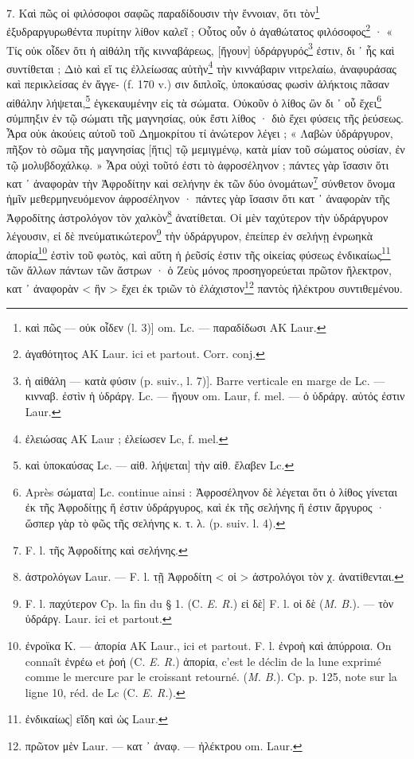 \documentclass[a4paper, 11pt, oneside, polutonikogreek, french]{article}
\begin{document}
7. Καὶ πῶς οἱ φιλόσοφοι σαφῶς παραδίδουσιν τὴν ἔννοιαν, ὅτι τὸν\footnote{καὶ πῶς --- οὐκ οἶδεν (l. 3)] om. Lc. --- παραδίδωσι AK Laur.} ἐξυδραργυρωθέντα πυρίτην λίθον καλεῖ ; Οὗτος οὖν ὁ ἀγαθώτατος φιλόσοφος\footnote{ἀγαθότητος AK Laur. ici et partout. Corr. conj.} · « Τίς οὐκ οἶδεν ὅτι ἡ αἰθάλη τῆς κινναβάρεως, [ἤγουν] ὑδράργυρός\footnote{ἡ αἰθάλη --- κατὰ φύσιν (p. suiv., l. 7)]. Barre verticale en marge de Lc. --- κινναβ. ἐστὶν ἡ ὐδράργ. Lc. --- ἤγουν om. Laur, f. mel. --- ὁ ὑδράργ. αὐτός ἐστιν Laur.} ἐστιν, δι ᾽ ἧς καὶ συντίθεται ; Διὸ καὶ εἴ τις ἐλλείωσας αὐτὴν\footnote{ἐλειώσας AK Laur ; ἐλείωσεν Lc, f. mel.} τὴν κιννάβαριν νιτρελαίω, ἀναφυράσας καὶ περικλείσας ἐν ἄγγε- (f. 170 v.) σιν διπλοῖς, ὑποκαύσας φωσὶν ἀλήκτοις πᾶσαν αἰθάλην λήψεται,\footnote{καὶ ὑποκαύσας Lc. --- αἰθ. λήψεται] τὴν αἰθ. ἔλαβεν Lc.} ἐγκεκαυμένην εἰς τὰ σώματα. Οὐκοῦν ὁ λίθος ὢν δι ᾽ οὗ ἔχει\footnote{Après σώματα] Lc. continue ainsi : Ἀφροσέληνον δὲ λέγεται ὅτι ὁ λίθος γίνεται ἐκ τῆς Ἀφροδίτῃς ἥ ἐστιν ὑδράργυρος, καὶ ἐκ τῆς σελήνης ἥ ἐστιν ἄργυρος · ὥσπερ γὰρ τὸ φῶς τῆς σελήνης κ. τ. λ. (p. suiv. l. 4).} σύμπηξιν ἐν τῷ σώματι τῆς μαγνησίας, οὐκ ἔστι λίθος · διὸ ἔχει φύσεις τῆς ῥεύσεως. Ἆρα οὐκ ἀκούεις αὐτοῦ τοῦ Δημοκρίτου τί ἀνώτερον λέγει ; « Λαβὼν ὑδράργυρον, πῆξον τὸ σῶμα τῆς μαγνησίας [ἥτις] τῷ μεμιγμένῳ, κατὰ μίαν τοῦ σώματος οὐσίαν, ἐν τῷ μολυβδοχάλκῳ. » Ἆρα οὐχὶ τοῦτό ἐστι τὸ ἀφροσέληνον ; πάντες γὰρ ἴσασιν ὅτι κατ ᾽ ἀναφορὰν τὴν Ἀφροδίτην καὶ σελήνην ἐκ τῶν δύο ὀνομάτων\footnote{F. l. τῆς Ἀφροδίτης καὶ σελήνης.} σύνθετον ὄνομα ἡμῖν μεθερμηνευόμενον ἀφροσέληνον · πάντες γὰρ ἴσασιν ὅτι κατ ᾽ ἀναφορὰν τῆς Ἀφροδίτης ἀστρολόγον τὸν χαλκὸν\footnote{ἀστρολόγων Laur. --- F. l. τῇ Ἀφροδίτη < οἱ > ἀστρολόγοι τὸν χ. ἀνατίθενται.} ἀνατίθεται. Οἱ μὲν ταχύτερον τὴν ὑδράργυρον λέγουσιν, εἰ δὲ πνεύματικώτερον\footnote{F. l. παχύτερον Cp. la fin du § 1. (C. \emph{E. R.}) εἰ δὲ] F. l. οἱ δὲ (\emph{M. B.}). --- τὸν ὑδράργ. Laur. ici et partout.} τὴν ὑδράργυρον, ἐπείπερ ἐν σελήνῃ ἐνρωηκὰ ἀπορία\footnote{ἐνροϊκα K. --- ἀπορία AK Laur., ici et partout. F. l. ἐνροὴ καὶ ἀπύρροια. On connaît ἐνρέω et ῥοή (C. \emph{E. R.}) ἀπορία, c'est le déclin de la lune exprimé comme le mercure par le croissant retourné. (\emph{M. B.}). Cp. p. 125, note sur la ligne 10, réd. de Lc (C. \emph{E. R.}).} ἐστὶν τοῦ φωτὸς, καὶ αὕτη ἡ ῥεῦσίς ἐστιν τῆς οἰκείας φύσεως ἐνδικαίως\footnote{ἐνδικαίως] εἴδη καὶ ὡς Laur.} τῶν ἄλλων πάντων τῶν ἄστρων · ὁ Ζεὺς μόνος προσηγορεύεται πρῶτον ἤλεκτρον, κατ ᾽ ἀναφορὰν < ἣν > ἔχει ἐκ τριῶν τὸ ἐλάχιστον\footnote{πρῶτον μὲν Laur. --- κατ ᾽ ἀναφ. --- ἠλέκτρου om. Laur.} παντὸς ἠλέκτρου συντιθεμένου.
\end{document}
